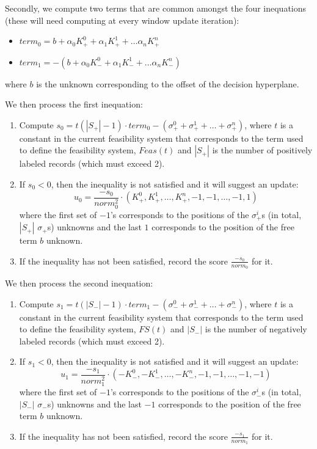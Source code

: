 \documentclass[a4paper,twoside,10pt]{report}
\begin{document}
	Secondly, we compute two terms that are common amongst the four inequations (these will need computing at every window update iteration):			
	\begin{itemize}
		\item \(term_0 = b + \alpha_0 K_+^0 + \alpha_1 K_+^1 + \ldots \alpha_n K_+^n\)
		\item \(term_1 = -(b + \alpha_0 K_-^0 + \alpha_1 K_-^1 + \ldots \alpha_n K_-^n)\)
	\end{itemize}	
	where \(b\) is the unknown corresponding to the offset of the decision hyperplane.
	
	
	We then process the first inequation:
	
	\begin{enumerate}
		\item Compute \(s_0 = t (|S_+| - 1)\cdot term_0 - (\sigma_+^0 + \sigma_+^1 + \ldots + \sigma_+^n)\), where \(t\) is a constant in the current feasibility system that corresponds to the term used to define the feasibility system, \(Feas(t)\) and \(|S_+|\) is the number of positively labeled records (which must exceed 2).
		\item If \(s_0 < 0\), then the inequality is not satisfied and it will suggest an update:
		\[
			u_0 = \frac{-s_0}{norm_0^2}\cdot(K_+^0, K_+^1, \ldots, K_+^n, -1, -1, \ldots, -1, 1)
		\]		
		where the first set of \(-1\)'s corresponds to the positions of the \(\sigma_+^i\)s (in total, \(|S_+|\) \(\sigma_+\)s) unknowns and the last \(1\) corresponds to the position of the free term \(b\) unknown.
		\item If the inequality has not been satisfied, record the score \(\frac{-s_0}{norm_0}\) for it.
	\end{enumerate}
	
	
	
	We then process the second inequation:
	
	\begin{enumerate}
		\item Compute \(s_1 = t (|S_-| - 1)\cdot term_1 - (\sigma_-^0 + \sigma_-^1 + \ldots + \sigma_-^n)\), where \(t\) is a constant in the current feasibility system that corresponds to the term used to define the feasibility system, \(FS(t)\) and \(|S_-|\) is the number of negatively labeled records (which must exceed 2).
		\item If \(s_1 < 0\), then the inequality is not satisfied and it will suggest an update:
		\[
			u_1 = \frac{-s_1}{norm_1^2}\cdot(-K_-^0, -K_-^1, \ldots, -K_-^n, -1, -1, \ldots, -1, -1)
		\]		
		where the first set of \(-1\)'s corresponds to the positions of the \(\sigma_-^i\)s (in total, \(|S_-|\) \(\sigma_-\)s) unknowns and the last \(-1\) corresponds to the position of the free term \(b\) unknown.
		\item If the inequality has not been satisfied, record the score \(\frac{-s_1}{norm_1}\) for it.
	\end{enumerate}
		
\end{document}
